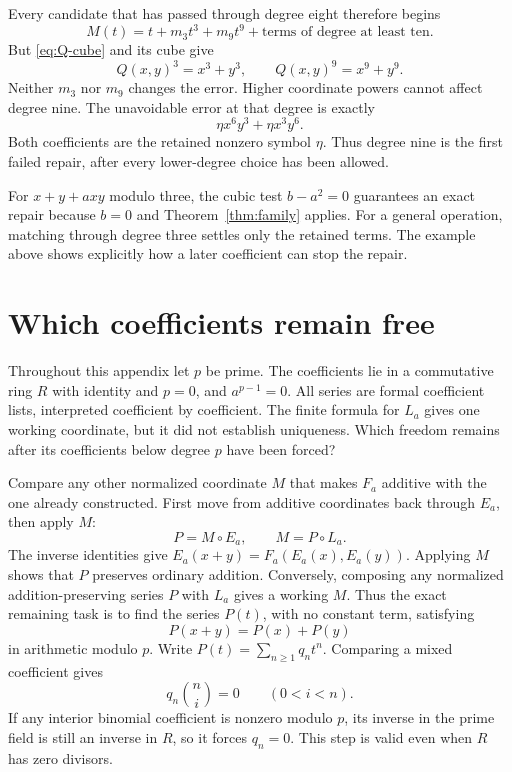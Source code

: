 \documentclass[11pt,letterpaper]{article}
\numberwithin{equation}{section}
\theoremstyle{definition}\newtheorem{example}[theorem]{Example}
\begin{document}
Every candidate that has passed through degree eight therefore begins
\[
 M(t)=t+m_3t^3+m_9t^9+\text{terms of degree at least ten}.
\]
But \eqref{eq:Q-cube} and its cube give
\[
 Q(x,y)^3=x^3+y^3,\qquad Q(x,y)^9=x^9+y^9.
\]
Neither \(m_3\) nor \(m_9\) changes the error. Higher coordinate powers cannot affect degree nine. The unavoidable error at that degree is exactly
\[
 \eta x^6y^3+\eta x^3y^6.
\]
Both coefficients are the retained nonzero symbol \(\eta\). Thus degree nine is the first failed repair, after every lower-degree choice has been allowed.

For \(x+y+a xy\) modulo three, the cubic test \(b-a^2=0\) guarantees an exact repair because \(b=0\) and Theorem~\ref{thm:family} applies. For a general operation, matching through degree three settles only the retained terms. The example above shows explicitly how a later coefficient can stop the repair.


\appendix

\section{Which coefficients remain free}\label{app:freedom}

Throughout this appendix let \(p\) be prime. The coefficients lie in a commutative ring \(R\) with identity and \(p=0\), and \(a^{p-1}=0\). All series are formal coefficient lists, interpreted coefficient by coefficient. The finite formula for \(L_a\) gives one working coordinate, but it did not establish uniqueness. Which freedom remains after its coefficients below degree \(p\) have been forced?

Compare any other normalized coordinate \(M\) that makes \(F_a\) additive with the one already constructed. First move from additive coordinates back through \(E_a\), then apply \(M\):
\[
 P=M\circ E_a,\qquad M=P\circ L_a.
\]
The inverse identities give \(E_a(x+y)=F_a(E_a(x),E_a(y))\). Applying \(M\) shows that \(P\) preserves ordinary addition. Conversely, composing any normalized addition-preserving series \(P\) with \(L_a\) gives a working \(M\). Thus the exact remaining task is to find the series \(P(t)\), with no constant term, satisfying
\[
 P(x+y)=P(x)+P(y)
\]
in arithmetic modulo \(p\). Write \(P(t)=\sum_{n\ge1}q_nt^n\). Comparing a mixed coefficient gives
\begin{equation}\label{eq:additive-coefficients}
 q_n\binom ni=0\qquad(0<i<n).
\end{equation}
If any interior binomial coefficient is nonzero modulo \(p\), its inverse in the prime field is still an inverse in \(R\), so it forces \(q_n=0\). This step is valid even when \(R\) has zero divisors.
\end{document}
